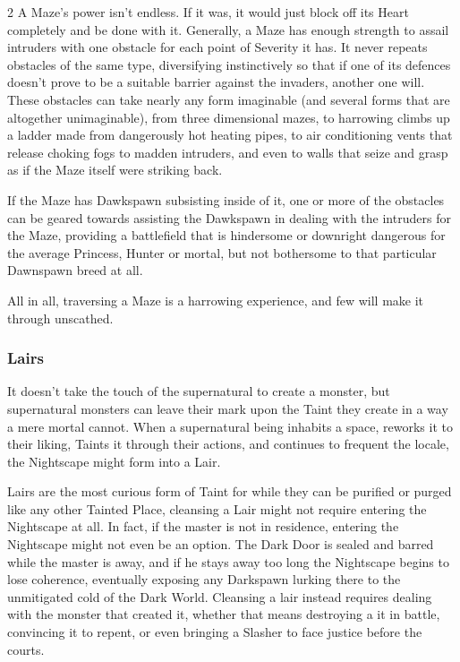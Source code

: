 \begin{multicols}{2}
A Maze’s power isn’t endless. If it was, it would just block off its Heart completely and be done with it. Generally, a Maze has enough strength to assail intruders with one obstacle for each point of Severity it has. It never repeats obstacles of the same type, diversifying instinctively so that if one of its defences doesn’t prove to be a suitable barrier against the invaders, another one will. These obstacles can take nearly any form imaginable (and several forms that are altogether unimaginable), from three dimensional mazes, to harrowing climbs up a ladder made from dangerously hot heating pipes, to air conditioning vents that release choking fogs to madden intruders, and even to walls that seize and grasp as if the Maze itself were striking back.

If the Maze has Dawkspawn subsisting inside of it, one or more of the obstacles can be geared towards assisting the Dawkspawn in dealing with the intruders for the Maze, providing a battlefield that is hindersome or downright dangerous for the average Princess, Hunter or mortal, but not bothersome to that particular Dawnspawn breed at all.

All in all, traversing a Maze is a harrowing experience, and few will make it through unscathed.

\subsubsection*{Lairs}

It doesn’t take the touch of the supernatural to create a monster, but supernatural monsters can leave their mark upon the Taint they create in a way a mere mortal cannot. When a supernatural being inhabits a space, reworks it to their liking, Taints it through their actions, and continues to frequent the locale, the Nightscape might form into a Lair. 

Lairs are the most curious form of Taint for while they can be purified or purged like any other Tainted Place, cleansing a Lair might not require entering the Nightscape at all. In fact, if the master is not in residence, entering the Nightscape might not even be an option. The Dark Door is sealed and barred while the master is away, and if he stays away too long the Nightscape begins to lose coherence, eventually exposing any Darkspawn lurking there to the unmitigated cold of the Dark World. Cleansing a lair instead requires dealing with the monster that created it, whether that means destroying a it in battle, convincing it to repent, or even bringing a Slasher to face justice before the courts. 


\end{multicols}
